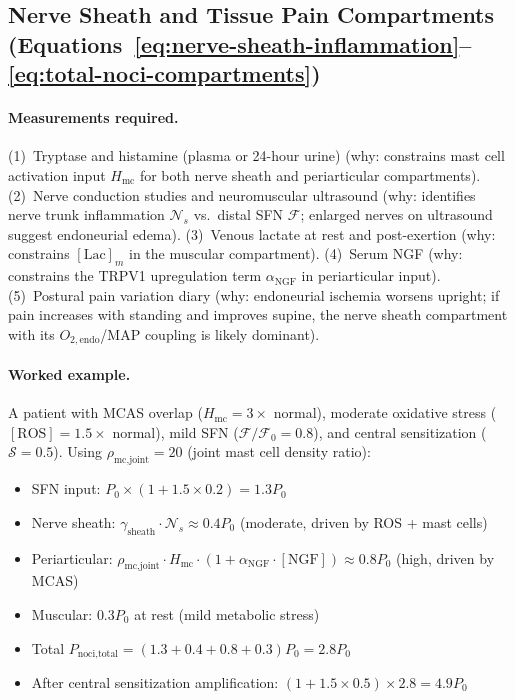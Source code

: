 \subsection{Nerve Sheath and Tissue Pain Compartments (Equations~\ref{eq:nerve-sheath-inflammation}--\ref{eq:total-noci-compartments})}

\paragraph{Measurements required.}
(1)~Tryptase and histamine (plasma or 24-hour urine) (why: constrains mast cell activation input $H_{\text{mc}}$ for both nerve sheath and periarticular compartments).
(2)~Nerve conduction studies and neuromuscular ultrasound (why: identifies nerve trunk inflammation $\mathcal{N}_s$ vs.\ distal SFN $\mathcal{F}$; enlarged nerves on ultrasound suggest endoneurial edema).
(3)~Venous lactate at rest and post-exertion (why: constrains $[\text{Lac}]_m$ in the muscular compartment).
(4)~Serum NGF (why: constrains the TRPV1 upregulation term $\alpha_{\text{NGF}}$ in periarticular input).
(5)~Postural pain variation diary (why: endoneurial ischemia worsens upright; if pain increases with standing and improves supine, the nerve sheath compartment with its $O_{2,\text{endo}}$/MAP coupling is likely dominant).

\paragraph{Worked example.}
A patient with MCAS overlap ($H_{\text{mc}} = 3\times$ normal), moderate oxidative stress ($[\text{ROS}] = 1.5\times$ normal), mild SFN ($\mathcal{F}/\mathcal{F}_0 = 0.8$), and central sensitization ($\mathcal{S} = 0.5$). Using $\rho_{\text{mc,joint}} = 20$ (joint mast cell density ratio):

\begin{itemize}
  \item SFN input: $P_0 \times (1 + 1.5 \times 0.2) = 1.3 P_0$
  \item Nerve sheath: $\gamma_{\text{sheath}} \cdot \mathcal{N}_s \approx 0.4 P_0$ (moderate, driven by ROS + mast cells)
  \item Periarticular: $\rho_{\text{mc,joint}} \cdot H_{\text{mc}} \cdot (1 + \alpha_{\text{NGF}} \cdot [\text{NGF}]) \approx 0.8 P_0$ (high, driven by MCAS)
  \item Muscular: $0.3 P_0$ at rest (mild metabolic stress)
  \item Total $P_{\text{noci,total}} = (1.3 + 0.4 + 0.8 + 0.3) P_0 = 2.8 P_0$
  \item After central sensitization amplification: $(1 + 1.5 \times 0.5) \times 2.8 = 4.9 P_0$
\end{itemize}


